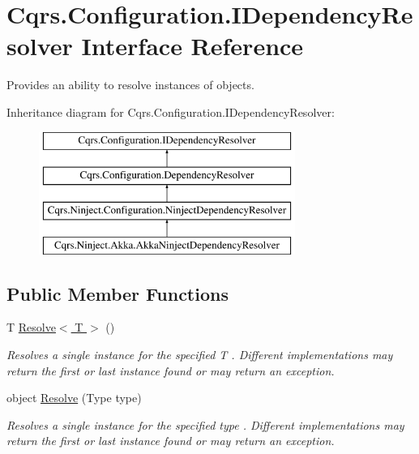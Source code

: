\hypertarget{interfaceCqrs_1_1Configuration_1_1IDependencyResolver}{}\section{Cqrs.\+Configuration.\+I\+Dependency\+Resolver Interface Reference}
\label{interfaceCqrs_1_1Configuration_1_1IDependencyResolver}


Provides an ability to resolve instances of objects.  


Inheritance diagram for Cqrs.\+Configuration.\+I\+Dependency\+Resolver\+:\begin{figure}[H]
\begin{center}
\leavevmode
\includegraphics[height=4.000000cm]{interfaceCqrs_1_1Configuration_1_1IDependencyResolver}
\end{center}
\end{figure}
\subsection*{Public Member Functions}
\begin{DoxyCompactItemize}
\item 
T \hyperlink{interfaceCqrs_1_1Configuration_1_1IDependencyResolver_a9dc7694a365209a5ef05270a7cfa7b6b_a9dc7694a365209a5ef05270a7cfa7b6b}{Resolve$<$ T $>$} ()
\begin{DoxyCompactList}\small\item\em Resolves a single instance for the specified {\itshape T} . Different implementations may return the first or last instance found or may return an exception. \end{DoxyCompactList}\item 
object \hyperlink{interfaceCqrs_1_1Configuration_1_1IDependencyResolver_aa455096b7b94fc1d64904bc67830ec06_aa455096b7b94fc1d64904bc67830ec06}{Resolve} (Type type)
\begin{DoxyCompactList}\small\item\em Resolves a single instance for the specified {\itshape type} . Different implementations may return the first or last instance found or may return an exception. \end{DoxyCompactList}\end{DoxyCompactItemize}


